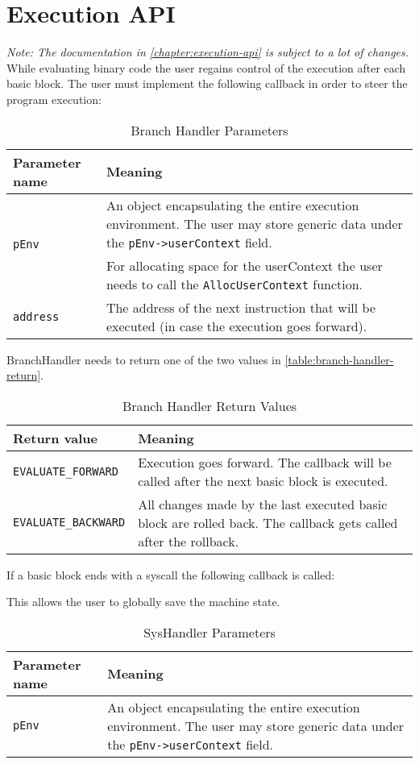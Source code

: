 \documentclass[12pt]{report}
\begin{document}
\chapter{Execution API}
\label{chapter:execution-api}
\textit{Note: The documentation in \autoref{chapter:execution-api} is subject to a lot of changes.}\\
While evaluating binary code the user regains control of the execution after each basic block. The user must implement the following callback in order to steer the program execution:

\begin{table}[H]
	\begin{tabular}{| p{6cm} | p{10cm} |}
		\hline
		\textbf{Parameter name}		   & \textbf{Meaning}\\ \hline
		\multirow{2}{*}{\texttt{pEnv}} & An object encapsulating the entire execution environment. The user may store generic data under the \texttt{pEnv->userContext} field.\\
									   & For allocating space for the userContext the user needs to call the \texttt{AllocUserContext} function.\\ \hline
		\texttt{address}			   & The address of the next instruction that will be executed (in case the execution goes forward).\\ \hline
	\end{tabular}
	\caption{Branch Handler Parameters}
	\label{table:branch-handler-parameters}
\end{table}
BranchHandler needs to return one of the two values in \autoref{table:branch-handler-return}.\\
\begin{table}[H]
	\begin{tabular}{| p{6cm} | p{10cm} |}
		\hline
		\textbf{Return value}      & \textbf{Meaning}\\ \hline
		\texttt{EVALUATE_FORWARD}  & Execution goes forward. The callback will be called after the next basic block is executed.\\ \hline
		\texttt{EVALUATE_BACKWARD} & All changes made by the last executed basic block are rolled back. The callback gets called after the rollback.\\ \hline
	\end{tabular}
	\label{table:branch-handler-return}
	\caption{Branch Handler Return Values}
\end{table}
If a basic block ends with a syscall the following callback is called:

This allows the user to globally save the machine state.\\
\begin{table}[H]
	\begin{tabular}{| p{6cm} | p{10cm} |}
		\hline
		\textbf{Parameter name} & \textbf{Meaning}\\ \hline
		\texttt{pEnv}			& An object encapsulating the entire execution environment. The user may store generic data under the \texttt{pEnv->userContext} field.\\ \hline
	\end{tabular}
	\caption{SysHandler Parameters}
	\label{table:syshandler-parameters}
\end{table}

\appendix
\end{document}
